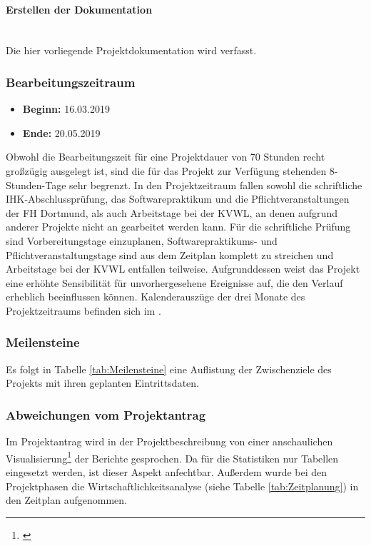 \paragraph{Erstellen der Dokumentation}~\\\label{p:Dokumentation}
Die hier vorliegende Projektdokumentation wird verfasst.

\subsubsection{Bearbeitungszeitraum}\label{sec:Bearbeitungszeitraum}
\begin{itemize}
	\item \textbf{Beginn:} 16.03.2019
	\item \textbf{Ende:} 20.05.2019
\end{itemize}
Obwohl die Bearbeitungszeit für eine Projektdauer von 70 Stunden recht großzügig ausgelegt ist, sind die für das Projekt zur Verfügung stehenden 8-Stunden-Tage sehr begrenzt. In den Projektzeitraum fallen sowohl die schriftliche IHK-Abschlussprüfung, das Softwarepraktikum und die Pflichtveranstaltungen der \ac{FH} Dortmund, als auch Arbeitstage bei der \ac{KVWL}, an denen aufgrund anderer Projekte nicht an \projektName gearbeitet werden kann. Für die schriftliche Prüfung sind Vorbereitungstage einzuplanen, Softwarepraktikums- und Pflichtveranstaltungstage sind aus dem Zeitplan komplett zu streichen und Arbeitstage bei der \ac{KVWL} entfallen \ggfs teilweise.
Aufgrunddessen weist das Projekt eine erhöhte Sensibilität für unvorhergesehene Ereignisse auf, die den Verlauf erheblich beeinflussen können.
Kalenderauszüge der drei Monate des Projektzeitraums befinden sich im .

\subsubsection{Meilensteine}\label{sec:Meilensteine}
Es folgt in Tabelle \ref{tab:Meilensteine} eine Auflistung der Zwischenziele des Projekts mit ihren geplanten Eintrittsdaten.

\subsubsection{Abweichungen vom Projektantrag}\label{sec:AbweichungenProjektantrag}
Im Projektantrag wird in der Projektbeschreibung von einer anschaulichen Visualisierung\footnote{\cite{Projektantrag}} der Berichte gesprochen. Da für die Statistiken nur Tabellen eingesetzt werden, ist dieser Aspekt anfechtbar.
Außerdem wurde bei den Projektphasen die Wirtschaftlichkeitsanalyse (siehe Tabelle \ref{tab:Zeitplanung}) in den Zeitplan aufgenommen.